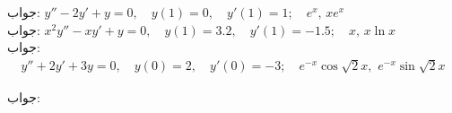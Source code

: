 جواب:
$y''-2y'+y=0, \quad y(1)=0, \quad y'(1)=1;\quad e^x,\, xe^x$\\

جواب:
$x^2y''-xy'+y=0, \quad y(1)=3.2, \quad y'(1)=-1.5;\quad x,\, x\ln x$\\

جواب:
\begin{align*}
y''+2y'+3y=0, \quad y(0)=2, \quad y'(0)=-3;\quad e^{-x}\cos \sqrt{2}x, \,\, e^{-x}\sin \sqrt{2} x
\end{align*}

جواب:

